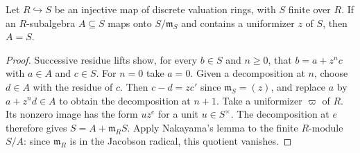 \begin{lemma}
\label{fw:uniformizer-residue-generation}
\leanok
Let $R\hookrightarrow S$ be an injective map of discrete valuation rings,
with $S$ finite over $R$. If an $R$-subalgebra $A\subseteq S$ maps onto
$S/\mathfrak m_S$ and contains a uniformizer $z$ of $S$, then $A=S$.
\end{lemma}
\begin{proof}
Successive residue lifts show, for every $b\in S$ and $n\geq0$, that
$b=a+z^n c$ with $a\in A$ and $c\in S$. For $n=0$ take $a=0$.
Given a decomposition at $n$, choose $d\in A$ with the residue of $c$.
Then $c-d=zc'$ since $\mathfrak m_S=(z)$, and replace $a$ by
$a+z^nd\in A$ to obtain the decomposition at $n+1$.
Take a uniformizer $\varpi$ of $R$. Its nonzero image has the form
$uz^e$ for a unit $u\in S^\times$. The decomposition at $e$ therefore
gives $S=A+\mathfrak m_RS$. Apply Nakayama's lemma to the finite
$R$-module $S/A$: since $\mathfrak m_R$ is in the Jacobson radical,
this quotient vanishes.
\end{proof}

